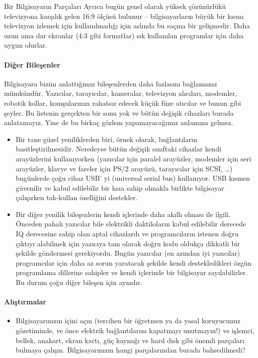 \documentclass[10pt,a5paper]{book}
\begin{document}
\begin{section}{Bir Bilgisayarın Parçaları}
Ayrıca bugün genel olarak yüksek çözünürlükü televizyona karşılık gelen 16:9 ölçüsü bulunur – bilgisayarların büyük bir kısmı televizyon izlemek için kullanılmadığı için aslında bu saçma bir gelişmedir. Daha uzun ama dar ekranlar (4:3 gibi formatlar) sık kullanılan programlar için daha uygun olurlar.
\paragraph{Diğer Bileşenler}{Bilgisayara bizim anlattığımız bileşenlerden daha fazlasını bağlamanız mümkündür. Yazıcılar, tarayıcılar, kameralar, televizyon alıcıları, modemler, robotik kollar, komşularınızı rahatsız edecek küçük füze atıcılar ve bunun gibi şeyler. Bu listenin gerçekten bir sonu yok ve bütün değişik cihazları burada anlatamayız. Yine de bu birkaç gözlem yapamayacağımız anlamına gelmez.}
\begin{itemize}
 \item Bir tane güzel yeniliklerden biri, örnek olarak, bağlantıların basitleştirilmesidir. Neredeyse bütün değişik sınıftaki cihazlar kendi arayüzlerini kullanıyorken (yazıcılar için paralel arayüzler, modemler için seri arayüzler, klavye ve fareler için PS/2 arayüzü, tarayıcılar için SCSI, …) bugünlerde çoğu cihaz USB' yi (universal serial bus) kullanıyor. USB kısmen güvenilir ve kabul edilebilir bir hıza sahip olmakla birlikte bilgisayar çalışırken tak-kullan özelliğini destekler.
 \item Bir diğer yenilik bileşenlerin kendi içlerinde daha akıllı olması ile ilgili. Önceden pahalı yazıcılar bile elektrikli daktiloların kabul edilebilir derecede IQ derecesine sahip olan aptal cihazlardı ve programcıların istenen doğru çıktıyı alabilmek için yazıcıya tam olarak doğru kodu oldukça dikkatli bir şekilde göndermesi gerekiyordu. Bugün yazıcılar (en azından iyi yazıcılar) programcılar için daha az sorun yaratacak şekilde kendi destekledikleri özgün programlama dillerine sahipler ve kendi içlerinde bir bilgisayar sayılabilirler. Bu durum çoğu diğer bileşen için aynıdır.
\end{itemize}
\paragraph{Alıştırmalar}{
\begin{itemize}
 \item Bilgisayarınızın içini açın (tercihen bir öğretmen ya da yasal koruyucunuz gözetiminde, ve önce elektrik bağlantılarını kapatmayı unutmayın!) ve işlemci, bellek, anakart, ekran kartı, güç kaynağı ve hard disk gibi önemli parçaları bulmaya çalışın. Bilgisayarınızın hangi parçalarından burada bahsedilmedi?
\end{itemize}}
\end{section}
\end{document}
